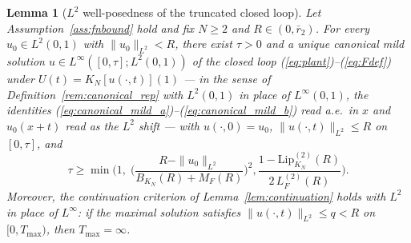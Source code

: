 \documentclass[amsthm]{autart}
\theoremstyle{plain}
\newtheorem{lemma}{Lemma}
\theoremstyle{definition}
\newcommand{\Linf}{L^\infty}
\newcommand{\Ltwo}{L^2}
\newcommand{\LipKn}{\mathrm{Lip}_{K_N}}
\begin{document}
\begin{lemma}[$\Ltwo$ well-posedness of the truncated closed loop]\label{lem:wellposedL2}
Let Assumption~\ref{ass:fnbound} hold and fix $N \ge 2$ and $R \in (0, \bar r_2)$. For every $u_0 \in \Ltwo(0,1)$ with $\|u_0\|_{\Ltwo} < R$, there exist $\tau > 0$ and a unique canonical mild solution $u \in \Linf([0,\tau]; \Ltwo(0,1))$ of the closed loop (\ref{eq:plant})--(\ref{eq:Fdef}) under $U(t) = K_N[u(\cdot,t)](1)$ --- in the sense of Definition~\ref{rem:canonical_rep} with $\Ltwo(0,1)$ in place of $\Linf(0,1)$, the identities (\ref{eq:canonical_mild_a})--(\ref{eq:canonical_mild_b}) read a.e.\ in $x$ and $u_0(x+t)$ read as the $\Ltwo$ shift --- with $u(\cdot,0) = u_0$, $\|u(\cdot,t)\|_{\Ltwo} \le R$ on $[0,\tau]$, and
\begin{equation}
\tau \ge \min\!\Biggl(1,\; \biggl(\frac{R - \|u_0\|_{\Ltwo}}{B_{K_N}(R) + M_F(R)}\biggr)^{\!2}, \frac{1 - \LipKn^{(2)}(R)}{2\, L_F^{(2)}(R)}\Biggr).
\label{eq:tau_lb_L2}
\end{equation}
Moreover, the continuation criterion of Lemma~\ref{lem:continuation} holds with $\Ltwo$ in place of $\Linf$: if the maximal solution satisfies $\|u(\cdot,t)\|_{\Ltwo} \le q < R$ on $[0, T_{\max})$, then $T_{\max} = \infty$.
\end{lemma}
\end{document}
